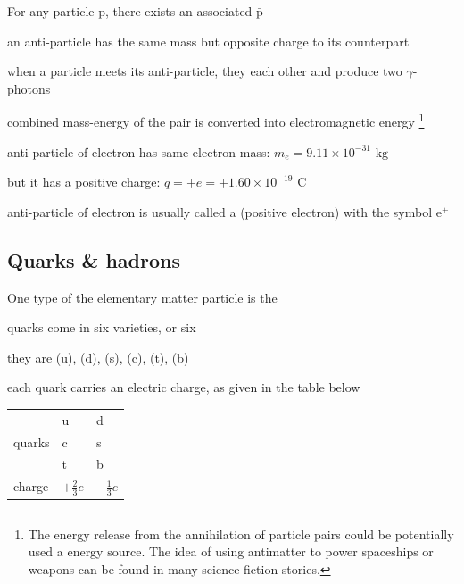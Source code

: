 For any particle $\text{p}$, there exists an associated  $\bar{\text{p}}$

\cmt an anti-particle has the same mass but opposite charge to its counterpart

\cmt when a particle meets its anti-particle, they  each other and produce two $\gamma$-photons

combined mass-energy of the pair is converted into electromagnetic energy
\footnote{The energy release from the annihilation of  particle pairs could be potentially used a energy source. The idea of using antimatter to power spaceships or weapons can be found in many science fiction stories.}




\begin{soln} anti-particle of electron has same electron mass: $m_e = 9.11\times10^{-31} \text{ kg}$

but it has a positive charge: $q = +e = + 1.60\times10^{-19} \text{ C}$

anti-particle of electron is usually called a  (positive electron) with the symbol $\text{e}^+$ \end{soln}


\subsection{Quarks \& hadrons}

One type of the elementary matter particle is the 

\cmt quarks come in six varieties, or six 

they are  (u),  (d),  (s),  (c),  (t),  (b)

\cmt each quark carries an electric charge, as given in the table below

\begin{center}
	{\renewcommand{\arraystretch}{1.35}
		\begin{tabular}{|C{3cm}|C{2cm}|C{2cm}|}
			\hline  & u & d \\
			 quarks & c & s \\
			  & t & b \\
			\hline charge & $+\frac{2}{3}e$ & $-\frac{1}{3}e$ \\[3pt]
			\hline
		\end{tabular}
	}
\end{center}

